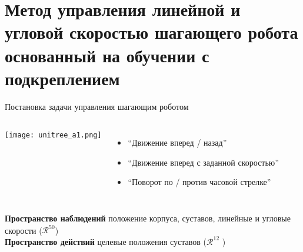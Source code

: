 


\section{Метод управления линейной и угловой скоростью шагающего робота основанный на обучении с подкреплением}

\begin{frame}{Постановка задачи управления шагающим роботом}
\begin{columns}
\centering
\texttt{[image: unitree\_a1.png]}
\begin{itemize}
    \item ``Движение вперед / назад''
	\item ``Движение вперед с заданной скоростью''
    \item ``Поворот по / против часовой стрелке''
\end{itemize}
\end{columns}
\textbf{Пространство наблюдений} положение корпуса, суставов, линейные и угловые скорости ($\mathcal{R}^{50}$) 
\\
\textbf{Пространство действий} целевые положения суставов ($\mathcal{R}^{12}$ )

\end{frame}

